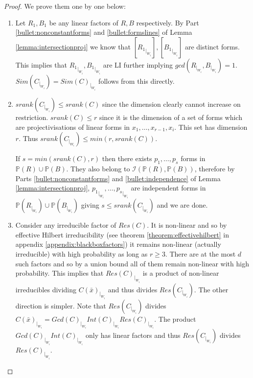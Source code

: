 \documentclass[12pt]{caltech_thesis}
\theoremstyle{plain}
\theoremstyle{definition}
\newcommand{\MI}{\mathcal{I}}
\newcommand{\PP}{\mathbb{P}}
\newcommand{\A}{\mathbb{A}}
\newcommand{\B}[1]{\bar{#1}}
\begin{document}
\begin{proof}
We prove them one by one below:
\begin{enumerate}
\item Let $R_1,B_1$ be any   linear factors of $R,B$ respectively. 
By Part \ref{bullet:nonconstantforms} and \ref{bullet:formslines} of Lemma \ref{lemma:intersectionproj} 
we know that $[{R_1}_{|_{W_i}}], [{B_1}_{|_{W_i}}]$
are distinct forms. This implies that ${R_1}_{|_{W_i}}, {B_1}_{|_{W_i}}$ are LI 
further implying
$gcd(R_{|_{W_i}}, B_{|_{W_i}})=1$. $Sim(C_{|_{W_i}}) = Sim(C)_{|_{W_i}}$ follows from this directly.


 \item  $srank(C_{|_{W_i}})\leq srank(C)$ since the dimension clearly cannot increase on restriction. $srank(C) \leq r$ 
 since it is the dimension of a set of forms  which are projectivisations of   linear forms
 in $x_1,\ldots,x_{r-1},x_i$. This set has dimension $r$. Thus $srank(C_{|_{W_i}}) \leq min(r, srank(C))$. 
 
 If $s = min(srank(C), r)$ then there exists $p_1,\ldots,p_s$ forms in $\PP(R)\cup \PP(B)$. 
 They also belong to $\MI(\PP(R),\PP(B))$, therefore by Parts \ref{bullet:nonconstantforms} and 
 \ref{bullet:independence} of Lemma \ref{lemma:intersectionproj}, ${p_1}_{|_{W_i}},\ldots,{p_s}_{|_{W_i}}$ are independent forms in
 $\PP(R_{|_{W_i}})\cup \PP(B_{|_{W_i}})$ giving $s\leq srank(C_{|_{W_i}})$ and we are done.  

\item Consider any irreducible factor of $Res(C)$. It is non-linear and so by effective Hilbert irreducibility (see theorem
\ref {theorem:effectivehilbert} in appendix \ref{appendix:blackboxfactors}) it remains
non-linear (actually irreducible) with high probability as long as $r\geq 3$. There are at the most $d$ such factors and so
by a union bound all of them remain non-linear with high probability. This implies that $Res(C)_{|_{W_i}}$ is a product of
non-linear irreducibles dividing $C(\B{x})_{|_{W_i}}$ and thus divides $Res(C_{|_{W_i}})$. The other direction is simpler.
Note that $Res(C_{|_{W_i}})$ divides $C(\B{x})_{|_{W_i}} = Gcd(C)_{|_{W_i}}Int(C)_{|_{W_i}}Res(C)_{|_{W_i}}$. 
The product $Gcd(C)_{|_{W_i}}Int(C)_{|_{W_i}}$ only has linear factors and thus $Res(C_{|_{W_i}})$ divides $Res(C)_{|_{W_i}}$.
 \end{enumerate}
\end{proof}
\end{document}
